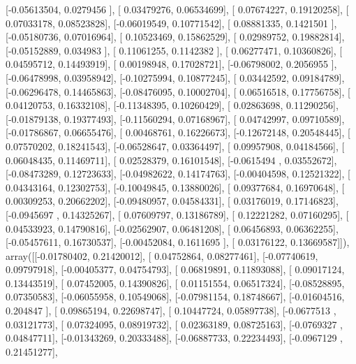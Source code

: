 \documentclass{article}
\begin{document}
       [-0.05613504,  0.0279456 ],
       [ 0.03479276,  0.06534699],
       [ 0.07674227,  0.19120258],
       [ 0.07033178,  0.08523828],
       [-0.06019549,  0.10771542],
       [ 0.08881335,  0.1421501 ],
       [-0.05180736,  0.07016964],
       [ 0.10523469,  0.15862529],
       [ 0.02989752,  0.19882814],
       [-0.05152889,  0.034983  ],
       [ 0.11061255,  0.1142382 ],
       [ 0.06277471,  0.10360826],
       [ 0.04595712,  0.14493919],
       [ 0.00198948,  0.17028721],
       [-0.06798002,  0.2056955 ],
       [-0.06478998,  0.03958942],
       [-0.10275994,  0.10877245],
       [ 0.03442592,  0.09184789],
       [-0.06296478,  0.14465863],
       [-0.08476095,  0.10002704],
       [ 0.06516518,  0.17756758],
       [ 0.04120753,  0.16332108],
       [-0.11348395,  0.10260429],
       [ 0.02863698,  0.11290256],
       [-0.01879138,  0.19377493],
       [-0.11560294,  0.07168967],
       [ 0.04742997,  0.09710589],
       [-0.01786867,  0.06655476],
       [ 0.00468761,  0.16226673],
       [-0.12672148,  0.20548445],
       [ 0.07570202,  0.18241543],
       [-0.06528647,  0.03364497],
       [ 0.09957908,  0.04184566],
       [ 0.06048435,  0.11469711],
       [ 0.02528379,  0.16101548],
       [-0.0615494 ,  0.03552672],
       [-0.08473289,  0.12723633],
       [-0.04982622,  0.14174763],
       [-0.00404598,  0.12521322],
       [ 0.04343164,  0.12302753],
       [-0.10049845,  0.13880026],
       [ 0.09377684,  0.16970648],
       [ 0.00309253,  0.20662202],
       [-0.09480957,  0.04584331],
       [ 0.03176019,  0.17146823],
       [-0.0945697 ,  0.14325267],
       [ 0.07609797,  0.13186789],
       [ 0.12221282,  0.07160295],
       [ 0.04533923,  0.14790816],
       [-0.02562907,  0.06481208],
       [ 0.06456893,  0.06362255],
       [-0.05457611,  0.16730537],
       [-0.00452084,  0.1611695 ],
       [ 0.03176122,  0.13669587]]), array([[-0.01780402,  0.21420012],
       [ 0.04752864,  0.08277461],
       [-0.07740619,  0.09797918],
       [-0.00405377,  0.04754793],
       [ 0.06819891,  0.11893088],
       [ 0.09017124,  0.13443519],
       [ 0.07452005,  0.14390826],
       [ 0.01151554,  0.06517324],
       [-0.08528895,  0.07350583],
       [-0.06055958,  0.10549068],
       [-0.07981154,  0.18748667],
       [-0.01604516,  0.204847  ],
       [ 0.09865194,  0.22698747],
       [ 0.10447724,  0.05897738],
       [-0.0677513 ,  0.03121773],
       [ 0.07324095,  0.08919732],
       [ 0.02363189,  0.08725163],
       [-0.0769327 ,  0.04847711],
       [-0.01343269,  0.20333488],
       [-0.06887733,  0.22234493],
       [-0.0967129 ,  0.21451277],
\end{document}
